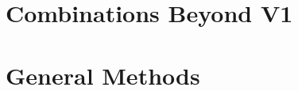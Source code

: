 \documentclass[11pt, a4paper]{report}
\numberwithin{equation}{section}
\begin{document}
\chapter{Combinations Beyond V1}


\chapter{General Methods}



%


\end{document}
